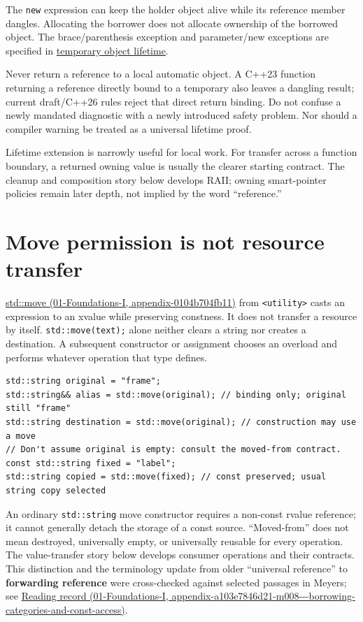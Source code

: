 The \texttt{new} expression can keep the holder object alive while its reference member dangles. Allocating the borrower does not allocate ownership of the borrowed object. The brace/parenthesis exception and parameter/new exceptions are specified in \href{https://eel.is/c++draft/class.temporary}{temporary object lifetime}.

Never return a reference to a local automatic object. A C++23 function returning a reference directly bound to a temporary also leaves a dangling result; current draft/C++26 rules reject that direct return binding. Do not confuse a newly mandated diagnostic with a newly introduced safety problem. Nor should a compiler warning be treated as a universal lifetime proof.

Lifetime extension is narrowly useful for local work. For transfer across a function boundary, a returned owning value is usually the clearer starting contract. The cleanup and composition story below develops RAII; owning smart-pointer policies remain later depth, not implied by the word ``reference.''

\section{Move permission is not resource transfer}\label{05-engine-i-ch003-move-permission-is-not-resource-transfer}

\href{../01-Foundations-I/main.pdf\#nameddest=appendix-0104b704fb11}{std::move (01-Foundations-I, appendix-0104b704fb11)} from \texttt{\textless{}utility\textgreater{}} casts an expression to an xvalue while preserving constness. It does not transfer a resource by itself. \texttt{std::move(text);} alone neither clears a string nor creates a destination. A subsequent constructor or assignment chooses an overload and performs whatever operation that type defines.

\begin{verbatim}
std::string original = "frame";
std::string&& alias = std::move(original); // binding only; original still "frame"
std::string destination = std::move(original); // construction may use a move
// Don't assume original is empty: consult the moved-from contract.
const std::string fixed = "label";
std::string copied = std::move(fixed); // const preserved; usual string copy selected
\end{verbatim}

An ordinary \texttt{std::string} move constructor requires a non-const rvalue reference; it cannot generally detach the storage of a const source. ``Moved-from'' does not mean destroyed, universally empty, or universally reusable for every operation. The value-transfer story below develops consumer operations and their contracts. This distinction and the terminology update from older ``universal reference'' to \textbf{forwarding reference} were cross-checked against selected passages in Meyers; see \href{../01-Foundations-I/main.pdf\#nameddest=appendix-a103e7846d21-m008---borrowing-categories-and-const-access}{Reading record (01-Foundations-I, appendix-a103e7846d21-m008-\/-\/-borrowing-categories-and-const-access)}.

